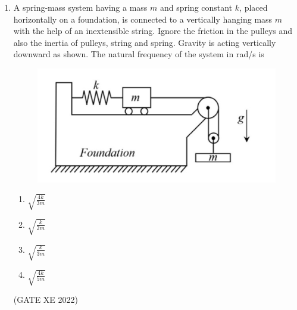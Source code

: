 \begin{enumerate}[label=\thechapter.\arabic*,ref=\thechapter.\theenumi]
\newpage
\item A spring-mass system having a mass $m$ and spring constant $k$, placed horizontally on a foundation, is connected to a vertically hanging mass $m$ with the help of an inextensible string. Ignore the friction in the pulleys and also the inertia of pulleys, string and spring. Gravity is acting vertically downward as shown. The natural frequency of the system in rad/s is 
\begin{figure}[htbp]
	\includegraphics[width=\columnwidth]{2022/XE/76/figs/question_xe76_22.jpg}
	\label{fig:question_xe76_22}
\end{figure}
\begin{enumerate}[label=(\Alph*)]
\item $\sqrt{\frac{4k}{3m}}$
\item $\sqrt{\frac{k}{2m}}$
\item $\sqrt{\frac{k}{3m}}$
\item $\sqrt{\frac{4k}{5m}}$
\end{enumerate}
\hfill(GATE XE 2022)
\\
\solution

\newpage


\end{enumerate}
